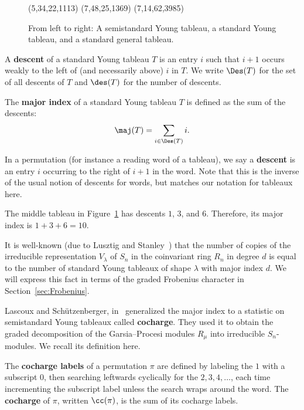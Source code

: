 \begin{figure}
	\centering
	\young(5,34,22,1113) \hspace{1cm} \young(7,48,25,1369) \hspace{1cm} \young(7,14,62,3985)
	\caption{From left to right: A semistandard Young tableau, a standard Young tableau, and a standard general tableau.} 
	\label{fig:tableaux}
\end{figure}

\begin{definition}
	A \textbf{descent} of a standard Young tableau $T$ is an entry $i$ such that $i+1$ occurs weakly to the left of (and necessarily above) $i$ in $T$.  We write $\Des(T)$ for the set of all descents of $T$ and $\des(T)$ for the number of descents.
	
	The \textbf{major index} of a standard Young tableau $T$ is defined as the sum of the descents: $$\maj(T)=\sum_{i\in \Des(T)} i.$$
	
	In a permutation (for instance a reading word of a tableau), we say a \textbf{descent} is an entry $i$ occurring to the right of $i+1$ in the word.  Note that this is the inverse of the usual notion of descents for words, but matches our notation for tableaux here.
\end{definition}

\begin{example}
	The middle tableau in Figure~\ref{fig:tableaux} has descents $1$, $3$, and $6$.  Therefore, its major index is $1+3+6=10$.
\end{example}

It is well-known (due to Lusztig and Stanley~\cite{Stanley}) that the number of copies of the irreducible representation $V_\lambda$ of $S_n$ in the coinvariant ring $R_n$ in degree $d$ is equal to the number of standard Young tableaux of shape $\lambda$ with major index $d$.  We will express this fact in terms of the graded Frobenius character in Section~\ref{sec:Frobenius}. 

Lascoux and Sch\"utzenberger, in~\cite{LascouxSchutzenberger} generalized the major index to a statistic on semistandard Young tableaux called \textbf{cocharge}.  They used it to obtain the graded decomposition of the Garsia--Procesi modules $R_\mu$ into irreducible $S_n$-modules.  We recall its definition here.

\begin{definition}
	The \textbf{cocharge labels} of a permutation $\pi$ are defined by labeling the $1$ with a subscript $0$, then searching leftwards cyclically for the $2,3,4,\ldots$, each time incrementing the subscript label unless the search wraps around the word.  The \textbf{cocharge} of $\pi$, written $\cc(\pi)$, is the sum of its cocharge labels.
\end{definition}

